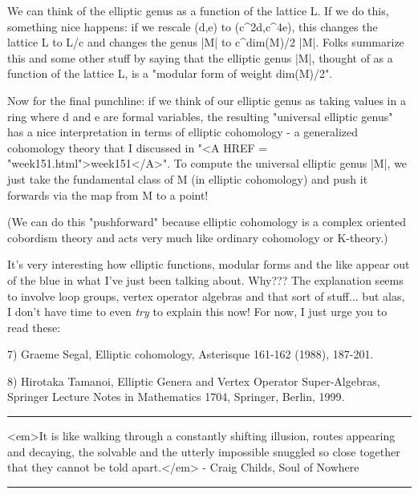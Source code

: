 We can think of the elliptic genus as a function of the lattice L.   
If we do this, something nice happens: if we rescale (d,e) to (c^{2d},c^{4e}), this changes the 
lattice L to L/c and changes the genus |M| to c^{dim(M)/2} |M|.  Folks 
summarize this and some other stuff by saying that the elliptic genus |M|, 
thought of as a function of the lattice L, is a "modular form of 
weight dim(M)/2".

Now for the final punchline: if we think of our elliptic genus as taking
values in a ring where d and e are formal variables, the resulting
"universal elliptic genus" has a nice interpretation in terms
of elliptic cohomology - a generalized cohomology theory that I
discussed in "<A HREF = "week151.html">week151</A>".  To
compute the universal elliptic genus |M|, we just take the fundamental
class of M (in elliptic cohomology) and push it forwards via the map
from M to a point!

(We can do this "pushforward" because elliptic cohomology is a
complex oriented cobordism theory and acts very much like ordinary
cohomology or K-theory.)

It's very interesting how elliptic functions, modular forms and the like
appear out of the blue in what I've just been talking about.  Why???
The explanation seems to involve loop groups, vertex operator algebras and
that sort of stuff... but alas, I don't have time to even \emph{try} 
to explain this now!  For now, I just urge you to read these:

7) Graeme Segal, Elliptic cohomology, Asterisque 161-162 (1988), 187-201.  

8) Hirotaka Tamanoi, Elliptic Genera and Vertex Operator Super-Algebras,
Springer Lecture Notes in Mathematics 1704, Springer, Berlin, 1999.






 \par\noindent\rule{\textwidth}{0.4pt}
<em>It is like walking through a constantly shifting illusion, 
routes appearing and decaying, the solvable and the utterly impossible
snuggled so close together that they cannot be told apart.</em> - 
Craig Childs, Soul of Nowhere
\par\noindent\rule{\textwidth}{0.4pt}


